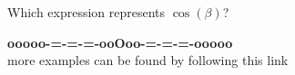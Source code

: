 \documentclass{ximera}
\begin{document}
\begin{question} 


Which expression represents $\cos(\beta)$?

\begin{multipleChoice}
\end{multipleChoice}

\end{question}
























\begin{center}
\textbf{\textcolor{green!50!black}{ooooo-=-=-=-ooOoo-=-=-=-ooooo}} \\

more examples can be found by following this link\\ 

\end{center}
\end{document}
